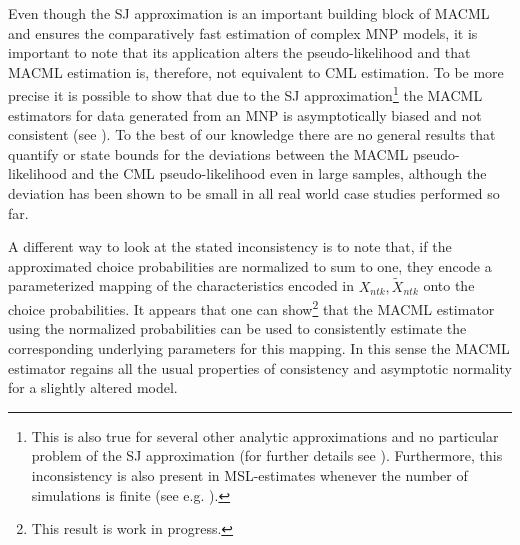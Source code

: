 \documentclass[12pt, a4paper]{article}
\numberwithin{defcounter}{section}
\numberwithin{excounter}{section}
\begin{document}
Even though the \ac{SJ} approximation is an important building block of \ac{MACML} and ensures the comparatively fast estimation of complex \ac{MNP} models, it is important to note that its application alters the pseudo-likelihood and that \ac{MACML} estimation is, therefore, not equivalent to \ac{CML} estimation. To be more precise it is possible to show that due to the \ac{SJ} approximation\footnote{This is also true for several other analytic approximations and no particular problem of the \ac{SJ} approximation (for further details see \cite{batram2016}). Furthermore, this inconsistency is also present in \ac{MSL}-estimates whenever the number of simulations is finite (see e.g. \cite{lee1992}).} the \ac{MACML} estimators for data generated from an \ac{MNP} is asymptotically biased and not consistent (see \cite{batram2016}). 
To the best of our knowledge there are no general results that quantify or state bounds for the deviations between the \ac{MACML} pseudo-likelihood and the \ac{CML} pseudo-likelihood even in large samples, 
although the deviation has been shown to be 
small in all real world case studies performed so far. 

A different way to look at the stated inconsistency is to note that, if the approximated choice probabilities are normalized to sum to one, they encode a parameterized mapping of the characteristics encoded in $X_{ntk}, \tilde X_{ntk}$  onto the choice probabilities. 
It appears that one can show\footnote{This result is work in progress.}  that the \ac{MACML} estimator using the normalized probabilities 
can be used to consistently  estimate the corresponding underlying parameters for this mapping. In this sense the \ac{MACML} estimator regains all the usual properties of consistency and asymptotic normality for a slightly altered model.  
\end{document}
